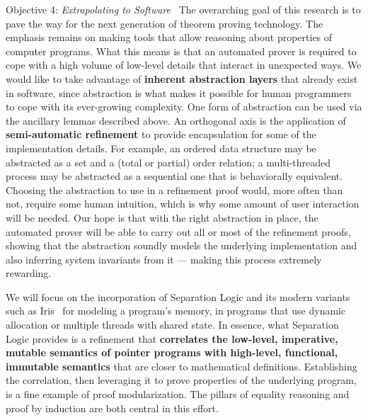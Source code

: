 \begin{paragraph}{Objective 4: {\it Extrapolating to Software}}~
The overarching goal of this research is to pave the way for the next generation of theorem proving technology.
The emphasis remains on making tools that allow reasoning about properties of computer programs.
What this means is that an automated prover is required to cope with a high volume of low-level details that interact in unexpected ways.
We would like to take advantage of \textbf{inherent abstraction layers} that already exist in software,
since abstraction is what makes it possible
for human programmers to cope with its ever-growing complexity.
One form of abstraction can be used via the ancillary lemmas described above.
An orthogonal axis is the application of \textbf{semi-automatic refinement} to provide encapsulation for some of the implementation details.
For example, an ordered data structure may be abstracted as a set and a (total or partial) order relation; a multi-threaded process may be abstracted as a sequential one that is behaviorally equivalent.
Choosing the abstraction to use in a refinement proof would, more often than not, require some human intuition, which is why some amount of user interaction will be needed.
Our hope is that with the right abstraction in place,  the automated prover will be able to carry out all or most of the refinement proofs,
showing that the abstraction soundly models the underlying implementation and also inferring system invariants from it --- making this process extremely rewarding.

We will focus on the incorporation of Separation Logic and its modern variants such as Iris~\cite{iris} for modeling a program's memory, \esp in programs that use dynamic allocation or multiple threads with shared state.
In essence, what Separation Logic provides is a refinement that \textbf{correlates the low-level, imperative, mutable semantics of pointer programs with high-level, functional, immutable semantics} that are closer to mathematical definitions.
Establishing the correlation, then leveraging it to prove properties of the underlying program, is a fine example of proof modularization.
The pillars of equality reasoning and proof by induction are both central in this effort.
\end{paragraph}


